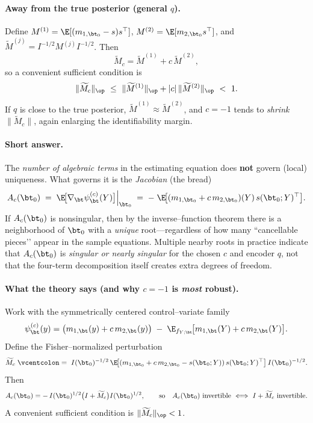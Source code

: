 {\paragraph{Away from the true posterior (general \(q\)).}
Define \(M^{(1)}=\E[(m_{1,\bt_0}-s)s^\top]\), \(M^{(2)}=\E[m_{2,\bt_0}s^\top]\), and
\(\widetilde M^{(j)}=I^{-1/2}M^{(j)}I^{-1/2}\). Then
\[
\widetilde M_c=\widetilde M^{(1)}+c\,\widetilde M^{(2)},
\]
so a convenient sufficient condition is
\[
\|\widetilde M_c\|_{\op}\ \le\ \|\widetilde M^{(1)}\|_{\op}+|c|\,\|\widetilde M^{(2)}\|_{\op}\ <\ 1.
\]
If \(q\) is close to the true posterior, \(\widetilde M^{(1)}\approx \widetilde M^{(2)}\), and \(c=-1\) tends to \emph{shrink} \(\|\widetilde M_c\|\), again enlarging the identifiability margin.
}


\paragraph{Short answer.}
The \emph{number of algebraic terms} in the estimating equation does \textbf{not}
govern (local) uniqueness. What governs it is the \emph{Jacobian} (the bread)
\[
A_c(\bt_0)\;=\;\E\!\big[\nabla_\bt \psi_\bt^{(c)}(Y)\big]\Big|_{\bt_0}
\;=\;-\;\E\!\big[(m_{1,\bt_0}+c\,m_{2,\bt_0})(Y)\,s(\bt_0;Y)^\top\big].
\]
If \(A_c(\bt_0)\) is nonsingular, then by the inverse–function theorem there is a
neighborhood of \(\bt_0\) with a \emph{unique} root—regardless of how many
“cancellable pieces’’ appear in the sample equations. Multiple nearby roots in
practice indicate that \(A_c(\bt_0)\) is \emph{singular or nearly singular}
for the chosen \(c\) and encoder \(q\), not that the four-term decomposition
itself creates extra degrees of freedom.

\paragraph{What the theory says (and why \(c=-1\) is \emph{most} robust).}
Work with the symmetrically centered control–variate family
\[
\psi_\bt^{(c)}(y)
=\big(m_{1,\bt}(y)+c\,m_{2,\bt}(y)\big)\;-\;\E_{f_{Y;\bt}}\!\big[m_{1,\bt}(Y)+c\,m_{2,\bt}(Y)\big].
\]
Define the Fisher–normalized perturbation
\[
\widetilde M_c
\;\vcentcolon=\;
I(\bt_0)^{-1/2}\,\E\!\big[(m_{1,\bt_0}+c\,m_{2,\bt_0}-s(\bt_0;Y))\,s(\bt_0;Y)^\top\big]\,
I(\bt_0)^{-1/2}.
\]
Then
\[
A_c(\bt_0)=-\,I(\bt_0)^{1/2}\big(I+\widetilde M_c\big)I(\bt_0)^{1/2},
\qquad
\text{so}\quad
A_c(\bt_0)\ \text{invertible}\ \Longleftrightarrow\ I+\widetilde M_c\ \text{invertible}.
\]
A convenient sufficient condition is \(\|\widetilde M_c\|_{\op}<1\).

